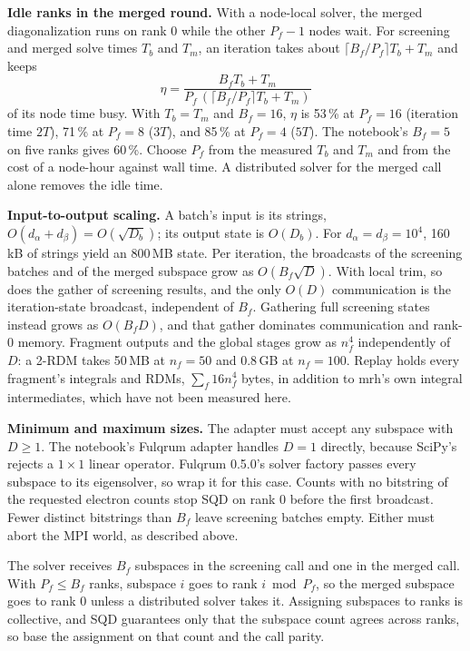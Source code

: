 \documentclass[11pt,a4paper]{article}
\newcommand{\code}[1]{\texttt{\detokenize{#1}}}
\begin{document}
\textbf{Idle ranks in the merged round.} With a node-local solver, the merged
diagonalization runs on rank 0 while the other $P_f - 1$ nodes wait. For
screening and merged solve times $T_b$ and $T_m$, an iteration takes about
$\lceil B_f/P_f \rceil T_b + T_m$ and keeps
\[
  \eta = \frac{B_f T_b + T_m}{P_f\,(\lceil B_f/P_f \rceil T_b + T_m)}
\]
of its node time busy. With $T_b = T_m$ and $B_f = 16$, $\eta$ is 53\,\% at
$P_f = 16$ (iteration time $2T$), 71\,\% at $P_f = 8$ ($3T$), and 85\,\% at
$P_f = 4$ ($5T$). The notebook's $B_f = 5$ on five ranks gives 60\,\%. Choose
$P_f$ from the measured $T_b$ and $T_m$ and from the cost of a node-hour
against wall time. A distributed solver for the merged call alone removes the
idle time.

\textbf{Input-to-output scaling.} A batch's input is its strings,
$O(d_\alpha + d_\beta) = O(\sqrt{D_b})$; its output state is $O(D_b)$. For
$d_\alpha = d_\beta = 10^4$, 160\,kB of strings yield an 800\,MB state. Per
iteration, the broadcasts of the screening batches and of the merged subspace
grow as $O(B_f\sqrt{D})$. With local trim, so does the gather of screening
results, and the only $O(D)$ communication is the iteration-state broadcast,
independent of $B_f$. Gathering full screening states instead grows as
$O(B_f D)$, and that gather dominates communication and rank-0 memory. Fragment
outputs and the global stages grow as $n_f^4$ independently of $D$: a 2-RDM
takes 50\,MB at $n_f = 50$ and 0.8\,GB at $n_f = 100$. Replay holds every
fragment's integrals and RDMs, $\sum_f 16 n_f^4$ bytes, in addition to mrh's own
integral intermediates, which have not been measured here.

\textbf{Minimum and maximum sizes.} The adapter must accept any subspace with
$D \ge 1$. The notebook's Fulqrum adapter handles $D = 1$ directly, because
SciPy's \code{eigsh} rejects a $1 \times 1$ linear operator. Fulqrum 0.5.0's
solver factory passes every subspace to its eigensolver, so wrap it for this
case. Counts with no bitstring of the requested electron counts stop SQD on
rank 0 before the first broadcast. Fewer distinct bitstrings than $B_f$ leave
screening batches empty. Either must abort the MPI world, as described above.

The solver receives $B_f$ subspaces in the screening call and one in the
merged call. With $P_f \le B_f$ ranks, subspace $i$ goes to rank $i \bmod
P_f$, so the merged subspace goes to rank 0 unless a distributed solver takes
it. Assigning subspaces to ranks is collective, and SQD guarantees only that
the subspace count agrees across ranks, so base the assignment on that count
and the call parity.
\end{document}
